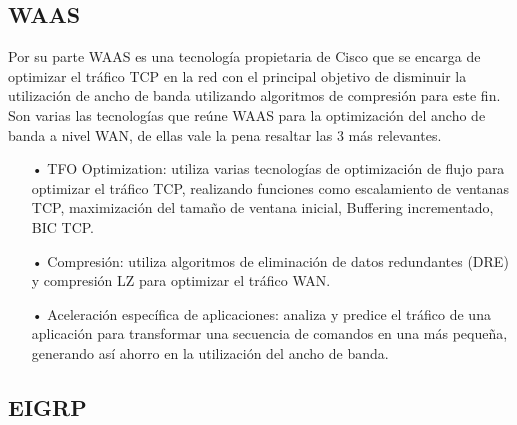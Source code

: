 \subsection{WAAS}
\label{sec:WAAS}

Por su parte WAAS es una tecnología propietaria de Cisco que se encarga de optimizar el tráfico TCP en la red con el principal objetivo de disminuir la utilización de ancho de banda utilizando algoritmos de compresión para este fin. Son varias las tecnologías que reúne WAAS para la optimización del ancho de banda a nivel WAN, de ellas vale la pena resaltar las 3 más relevantes.

\begin{itemize}
\item[•]TFO Optimization: utiliza varias tecnologías de optimización de flujo para optimizar el tráfico TCP, realizando funciones como escalamiento de ventanas TCP, maximización del tamaño de ventana inicial, Buffering incrementado, BIC TCP.
\item[•]Compresión: utiliza algoritmos de eliminación de datos redundantes (DRE) y compresión LZ para optimizar el tráfico WAN.
\item[•]Aceleración específica de aplicaciones: analiza y predice el tráfico de una aplicación para transformar una secuencia de comandos en una más pequeña, generando así ahorro en la utilización del ancho de banda.
\end{itemize}


\subsection{EIGRP}
\label{sec:EIGRP}


